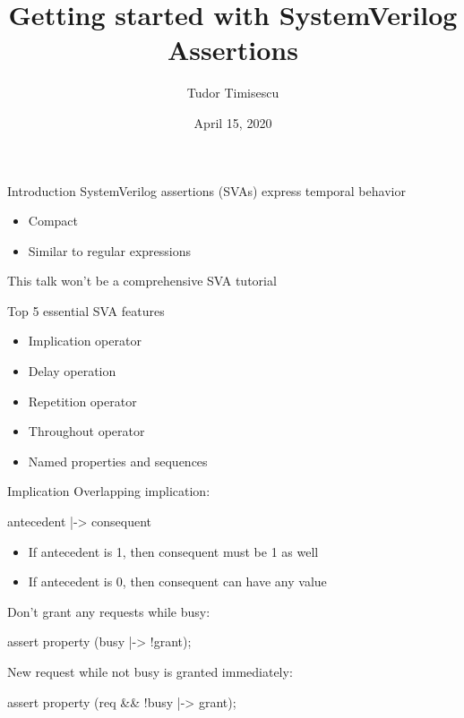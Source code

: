 \documentclass{beamer}
\title{Getting started with SystemVerilog Assertions}
\author{Tudor Timisescu}
\institute{VerificationGentleman.com}
\date{April 15, 2020}
\begin{document}
\begin{frame}
\titlepage
\end{frame}


\begin{frame}{Introduction}
SystemVerilog assertions (SVAs) express temporal behavior
\begin{itemize}
 \item Compact
 \item Similar to regular expressions
\end{itemize}
\vspace{\baselineskip}

\pause
This talk won't be a comprehensive SVA tutorial
\end{frame}


\begin{frame}{Top 5 essential SVA features}
\begin{itemize}
 \item Implication operator
 \item Delay operation
 \item Repetition operator
 \item Throughout operator
 \item Named properties and sequences
\end{itemize}
\end{frame}


\begin{frame}{Implication}
Overlapping implication:

\begin{semiverbatim}
antecedent |-> consequent
\end{semiverbatim}

\begin{itemize}
 \item If antecedent is 1, then consequent must be 1 as well
 \item If antecedent is 0, then consequent can have any value
\end{itemize}

\pause
Don't grant any requests while busy:
\begin{semiverbatim}
assert property (busy |-> !grant);
\end{semiverbatim}

\pause
New request while not busy is granted immediately:
\begin{semiverbatim}
assert property (req \&\& !busy |-> grant);
\end{semiverbatim}
\end{frame}
\end{document}
